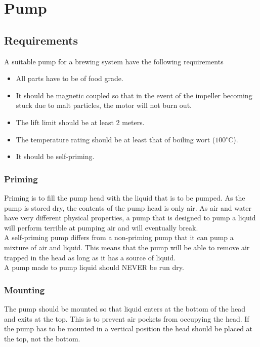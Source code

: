 \documentclass[11pt,fleqn]{book} %
\newcommand{\degree}{\ensuremath{^\circ}}
\begin{document}
\chapter{Pump}

\section{Requirements}

A suitable pump for a brewing system have the following requirements

\begin{itemize}
\item All parts have to be of food grade.
\item It should be magnetic coupled so that in the event of the impeller becoming stuck due to malt particles, the motor will not burn out.
\item The lift limit should be at least 2 meters.
\item The temperature rating should be at least that of boiling wort ($100\degree$C).
\item It should be self-priming.
\end{itemize}

\subsection{Priming}

Priming is to fill the pump head with the liquid that is to be pumped. As the pump is stored dry, the contents of the pump head is only air. As air and water have very different physical properties, a pump that is designed to pump a liquid will perform terrible at pumping air and will eventually break.\\

A self-priming pump differs from a non-priming pump that it can pump a mixture of air and liquid. This means that the pump will be able to remove air trapped in the head as long as it has a source of liquid.\\

A pump made to pump liquid should NEVER be run dry.

\subsection{Mounting}

The pump should be mounted so that liquid enters at the bottom of the head and exits at the top. This is to prevent air pockets from occupying the head. If the pump has to be mounted in a vertical position the head should be placed at the top, not the bottom.\\
\end{document}
